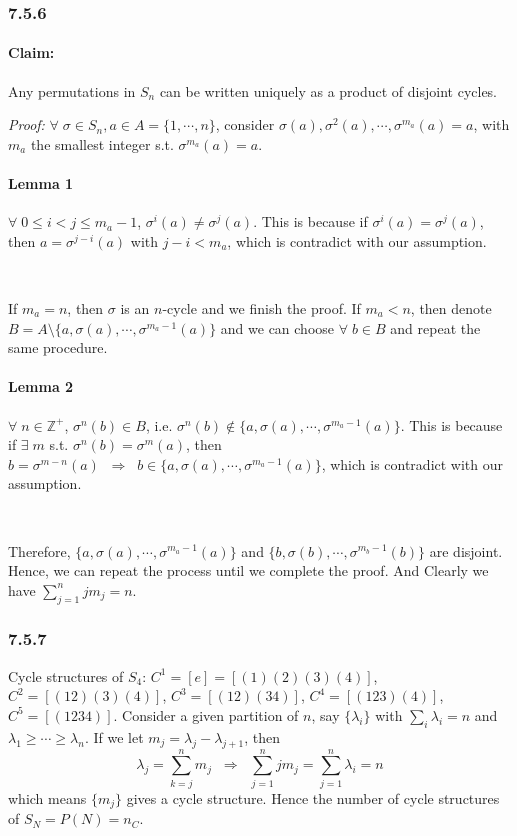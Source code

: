 \documentclass[]{ctexart}
\begin{document}
\subsubsection*{7.5.6}
\paragraph*{Claim:} Any permutations in $S_n$ can be written uniquely as a product of disjoint cycles. 

\textit{Proof:} $\forall\;\sigma\in S_n, a\in A=\{1,\cdots,n\}$, 
consider $\sigma(a),\sigma^2(a),\cdots,\sigma^{m_a}(a)=a$, with $m_a$ the smallest integer s.t. $\sigma^{m_a}(a)=a$.
\paragraph*{Lemma 1} $\forall\;0\le i<j\le m_a-1$, $\sigma^i(a)\ne\sigma^j(a)$. This is because if $\sigma^i(a)=\sigma^j(a)$, then $a=\sigma^{j-i}(a)$ 
with $j-i<m_a$, which is contradict with our assumption. 

$\;$

If $m_a=n$, then $\sigma$ is an $n$-cycle and we finish the proof. If $m_a<n$, then denote $B=A\setminus\{a,\sigma(a),\cdots,\sigma^{m_a-1}(a)\}$ 
and we can choose $\forall\;b\in B$ and repeat the same procedure. 
\paragraph*{Lemma 2} $\forall\;n\in\mathbb Z^+$, $\sigma^n(b)\in B$, i.e. $\sigma^n(b)\notin\{a,\sigma(a),\cdots,\sigma^{m_a-1}(a)\}$. This is because 
if $\exists\;m$ s.t. $\sigma^n(b)=\sigma^m(a)$, then $b=\sigma^{m-n}(a)\;\;\Rightarrow\;\;b\in \{a,\sigma(a),\cdots,\sigma^{m_a-1}(a)\}$, which is 
contradict with our assumption. 

$\;$

Therefore, $\{a,\sigma(a),\cdots,\sigma^{m_a-1}(a)\}$ and $\{b,\sigma(b),\cdots,\sigma^{m_b-1}(b)\}$ are disjoint. Hence, we can repeat the 
process until we complete the proof. And Clearly we have $\sum_{j=1}^n jm_j=n$. 
\subsubsection*{7.5.7} Cycle structures of $S_4$: $C^1=[e]=[(1)(2)(3)(4)]$, $C^2=[(12)(3)(4)]$, $C^3=[(12)(34)]$, $C^4=[(123)(4)]$, $C^5=[(1234)]$. 
Consider a given partition of $n$, say $\{\lambda_i\}$ with $\sum_i\lambda_i=n$ and $\lambda_1\ge\cdots\ge\lambda_n$. 
If we let $m_j=\lambda_j-\lambda_{j+1}$, then 
\begin{equation*}
\lambda_j=\sum_{k=j}^n m_j\;\;\Rightarrow\;\;\sum_{j=1}^n jm_j=\sum_{j=1}^n\lambda_i=n
\end{equation*}
which means $\{m_j\}$ gives a cycle structure. Hence the number of cycle structures of $S_N=P(N)=n_C$. 
\end{document}
